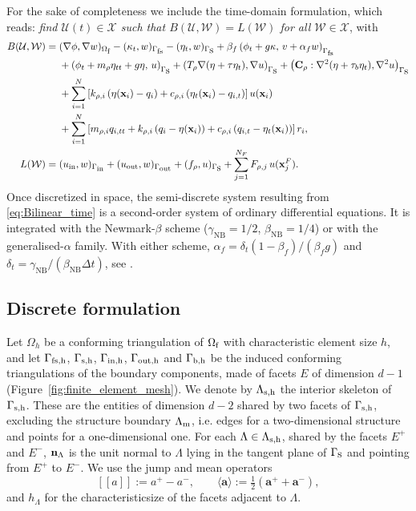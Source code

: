 For the sake of completeness we include the time-domain formulation, which reads: \textit{find $\mathcal{U}(t)\in\mathcal{X}$ such that $B(\mathcal{U},\mathcal{W})=L(\mathcal{W})$ for all $\mathcal{W}\in\mathcal{X}$}, with
\begin{align}
    \label{eq:Bilinear_time}
    B(\mathcal{U},\mathcal{W}) ={}&
    (\nabla\phi,\nabla w)_{\Omega_{\mbox{\scriptsize f}}}
    -(\kappa_t,w)_{\Gamma_{\mbox{\scriptsize fs}}}
    -(\eta_t,w)_{\Gamma_{\mbox{s}}}
    +\beta_f\left(\phi_t+g\kappa,\,v+\alpha_f w\right)_{\Gamma_{\mbox{\scriptsize fs}}}\\\nonumber
    &+\left(\phi_t+m_\rho\eta_{tt}+g\eta,\,u\right)_{\Gamma_{\mbox{s}}}
    +\left(T_\rho\nabla(\eta+\tau\eta_t),\nabla u\right)_{\Gamma_{\mbox{s}}}
    +\left(\mathbf{C}_\rho:\nabla^2(\eta+\tau_b\eta_t),\nabla^2u\right)_{\Gamma_{\mbox{s}}}\\\nonumber
    &+\sum_{i=1}^N\left[k_{\rho,i}\left(\eta(\mathbf{x}_i)-q_i\right)+c_{\rho,i}\left(\eta_t(\mathbf{x}_i)-q_{i,t}\right)\right]u(\mathbf{x}_i)\\\nonumber
    &+\sum_{i=1}^N\left[m_{\rho,i}q_{i,tt}+k_{\rho,i}\left(q_i-\eta(\mathbf{x}_i)\right)+c_{\rho,i}\left(q_{i,t}-\eta_t(\mathbf{x}_i)\right)\right]r_i,\\
    \label{eq:Linear_time}
    L(\mathcal{W}) ={}& (u_{\text{\scriptsize in}},w)_{\Gamma_{\mbox{\scriptsize in}}}+(u_{\text{\scriptsize out}},w)_{\Gamma_{\mbox{\scriptsize out}}}+(f_\rho,u)_{\Gamma_{\mbox{s}}}+\sum_{j=1}^{N_F}F_{\rho,j}\,u(\mathbf{x}_j^F).
\end{align}
Once discretized in space, the semi-discrete system resulting from \eqref{eq:Bilinear_time} is a second-order system of ordinary differential equations. It is integrated with the Newmark-$\beta$ scheme ($\gamma_{\mathrm{NB}}=1/2$, $\beta_{\mathrm{NB}}=1/4$) or with the generalised-$\alpha$ family. With either scheme, $\alpha_f=\delta_t(1-\beta_f)/(\beta_fg)$ and $\delta_t=\gamma_{\mathrm{NB}}/(\beta_{\mathrm{NB}}\Delta t)$, see \cite{colomes2023monolithic}.

\subsection{Discrete formulation}\label{subsec:discrete_form}

Let $\Omega_h$ be a conforming triangulation of $\Omega_{\mbox{\scriptsize f}}$ with characteristic element size $h$, and let $\Gamma_{\mbox{\scriptsize fs,h}}$, $\Gamma_{\mbox{\scriptsize s,h}}$, $\Gamma_{\mbox{\scriptsize in,h}}$, $\Gamma_{\mbox{\scriptsize out,h}}$ and $\Gamma_{\mbox{\scriptsize b,h}}$ be the induced conforming triangulations of the boundary components, made of facets $E$ of dimension $d-1$ (Figure~\ref{fig:finite_element_mesh}). We denote by $\Lambda_{\mbox{\scriptsize s,h}}$ the interior skeleton of $\Gamma_{\mbox{\scriptsize s,h}}$. These are the entities of dimension $d-2$ shared by two facets of $\Gamma_{\mbox{\scriptsize s,h}}$, excluding the structure boundary $\Lambda_{\mbox{\scriptsize m}}$, i.e. edges for a two-dimensional structure and points for a one-dimensional one. For each $\Lambda\in\Lambda_{\mbox{\scriptsize s,h}}$, shared by the facets $E^+$ and $E^-$, $\mathbf{n}_\Lambda$ is the unit normal to $\Lambda$ lying in the tangent plane of $\Gamma_{\mbox{s}}$ and pointing from $E^+$ to $E^-$. We use the jump and mean operators
\begin{equation}\label{eq:jump_mean}
    [\![a]\!] := a^+-a^-,\qquad
    \langle\mathbf{a}\rangle := \tfrac12\left(\mathbf{a}^++\mathbf{a}^-\right),
\end{equation}
and $h_\Lambda$ for the characteristicsize of the facets adjacent to $\Lambda$.

